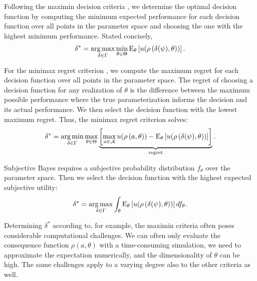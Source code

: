 Following the maximin decision criteria \citep{Gilboa.1989,Wald.1950}, we determine the optimal decision function by computing the minimum expected performance for each decision function over all points in the parameter space and choosing the one with the highest minimum performance. Stated concisely,
%
\begin{align*}
\delta^*= \operatorname*{arg\,max}_{\delta \in \Gamma } \min_{\theta\in \Theta} \mathrm{E}_{\theta}\left[u(\rho\left(\delta(\psi), \theta\right))\right].
\end{align*}

For the minimax regret criterion \citep{Manski.2004,Niehans.1948}, we compute the maximum regret for each decision function over all points in the parameter space. The regret of choosing a decision function for any realization of $\theta$ is the difference between the maximum possible performance where the true parameterization informs the decision and its actual performance. We then select the decision function with the lowest maximum regret. Thus, the minimax regret criterion solves:
%
\begin{align*}
\delta^* =  \operatorname*{arg\,min}_{\delta \in \Gamma } \max_{\theta\in \Theta}  \underbrace{\left[\max_{a \in \mathcal{A}}  u(\rho\left(a, \theta\right))  - \mathrm{E}_{\theta}\left[u(\rho\left(\delta(\psi), \theta\right)) \right]\right]}_{\text{regret}}.
\end{align*}

Subjective Bayes \citep{Savage.1954} requires a subjective probability distribution $f_{\theta}$ over the parameter space. Then we select the decision function with the highest expected subjective utility:
%
\begin{align*}
\delta^* = \operatorname*{arg\,max}_{\delta \in \Gamma }  \int_{\theta} \mathrm{E}_{\theta}\left[u(\rho\left(\delta(\psi), \theta\right))\right]df_{\theta}.
\end{align*}

Determining $\delta^*$ according to, for example, the maximin criteria often poses considerable computational challenges. We can often only evaluate the consequence function $\rho(a, \theta)$ with a time-consuming simulation, we need to approximate the expectation numerically, and the dimensionality of $\theta$ can be high. The same challenges apply to a varying degree also to the other criteria as well.\\
